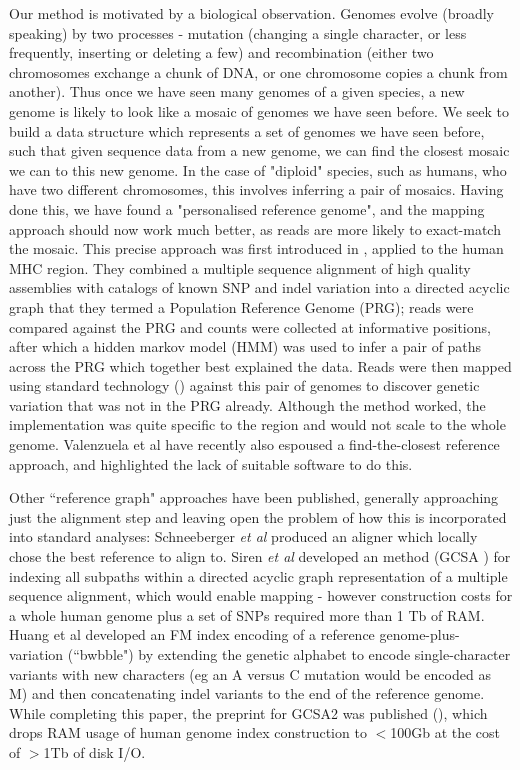 \documentclass[runningheads,a4paper]{llncs}
\begin{document}
Our method is motivated by a biological observation. Genomes evolve (broadly speaking) by two processes - mutation (changing a single character, or less frequently, inserting or deleting a few) and recombination (either two chromosomes exchange a chunk of DNA, or one chromosome copies a chunk from another). Thus once we have seen many genomes of a given species, a new genome is likely to look like a mosaic of genomes we have seen before.  We seek to build a data structure which represents a set of genomes we have seen before, such that given sequence data from a new genome, we can find the closest mosaic we can to this new genome. In the case of "diploid" species, such as humans, who have two different chromosomes, this involves inferring a pair of mosaics. Having done this, we have found a "personalised reference genome", and the mapping approach should now work much better, as reads are more likely to exact-match the mosaic. This precise approach was first introduced in \cite{dilthey}, applied to the human MHC region. They combined a multiple sequence alignment of high quality assemblies with catalogs of known SNP and indel variation into a directed acyclic graph that they termed a Population Reference Genome (PRG); reads were compared against the PRG and counts were collected at informative positions, after which a hidden markov model (HMM) was used to infer a pair of paths across the PRG which together best explained the data. Reads were then mapped using standard technology (\cite{bwa}) against this pair of genomes to discover genetic variation that was not in the PRG already. Although the method worked, the implementation was quite specific to the region and would not scale to the whole genome. Valenzuela et al \cite{valen} have recently also espoused a find-the-closest reference approach, and highlighted the lack of suitable software to do this.

Other ``reference graph" approaches have been published, generally approaching just the alignment step and leaving open the problem of how this is incorporated into standard analyses: Schneeberger \textit{et al} \cite{korbinian} produced an aligner which locally chose the best reference to align to. Siren \textit{et al} developed an  method (GCSA \cite{siren1}) for indexing all subpaths within a directed acyclic graph representation of a multiple sequence alignment, which would enable mapping - however construction costs for a whole human genome plus a set of SNPs required more than 1 Tb of RAM. Huang et al \cite{huang} developed an FM index encoding of a reference genome-plus-variation (``bwbble") by extending the genetic alphabet to encode single-character variants with new characters (eg an A versus C mutation would be encoded as M) and then concatenating indel variants to the end of the reference genome. While completing this paper, the preprint for GCSA2 was published (\cite{siren2}), which drops RAM usage of human genome index construction to $<$100Gb at the cost of $>$1Tb of disk I/O.   
\end{document}
